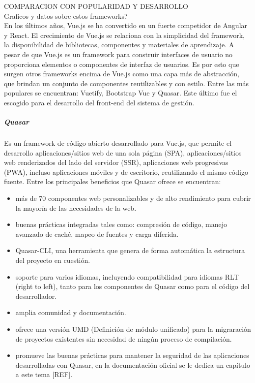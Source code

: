 COMPARACION CON POPULARIDAD Y DESARROLLO\\
Graficos y datos sobre estos frameworks?\\


En los últimos años, Vue.js se ha convertido
en un fuerte competidor de Angular y React. El 
crecimiento de Vue.js se relaciona con la simplicidad 
del framework, la disponibilidad de bibliotecas, componentes
y materiales de aprendizaje. A pesar de que Vue.js es 
un framework para construir interfaces de usuario no 
proporciona elementos o componentes de interfaz de usuarios. Es por esto que surgen  
otros frameworks encima de Vue.js como una capa más de abstracción, que 
brindan un conjunto de componentes reutilizables y con estilo. Entre 
las más populares se encuentran: Vuetify, Bootstrap Vue y Quasar.
Este último fue el escogido para el desarrollo del front-end del sistema de gestión. 
  



\subparagraph{Quasar}
Es un framework de código abierto desarrollado para Vue.js,
que permite el desarrollo aplicaciones/sitios web de una sola página (SPA),
aplicaciones/sitios web renderizados del lado del servidor (SSR),
aplicaciones web progresivas (PWA), incluso aplicaciones móviles y de 
escritorio, reutilizando el mismo código fuente. 
Entre los principales beneficios que Quasar ofrece 
se encuentran:

\begin{itemize}
    \item más de 70 componentes web personalizables y de alto rendimiento para cubrir la 
    mayoría de las necesidades de la web.
    \item buenas prácticas integradas tales como: compresión de código, 
    manejo avanzado de caché, mapeo de fuentes y carga diferida. 
    \item Quasar-CLI, una herramienta que genera de forma automática la estructura del 
    proyecto en cuestión.
    \item soporte para varios idiomas, incluyendo 
    compatibilidad para idiomas RLT (right to left), tanto para los componentes de Quasar
    como para el código del desarrollador.  
    \item amplia comunidad y documentación.
    \item ofrece una versión UMD (Definición de módulo unificado) para la migraración
    de proyectos existentes sin necesidad de ningún proceso de compilación.
    \item promueve las buenas prácticas para mantener la seguridad de las aplicaciones
    desarrolladas con Quasar, en la documentación oficial se le dedica un capítulo
    a este tema [REF].

\end{itemize}








